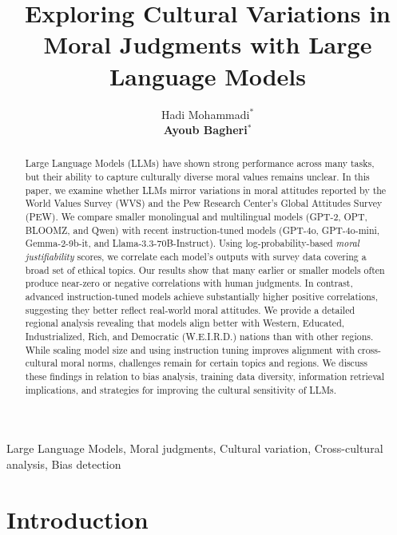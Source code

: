 \documentclass[a4paper,10pt,twoside]{article}
\begin{document}
\title{Exploring Cultural Variations in Moral Judgments with Large Language Models}

\author{Hadi Mohammadi$^*$ \\
{\normalsize \bf Ayoub Bagheri}$^*$ 
\AND {}}

\maketitle\thispagestyle{empty}

\begin{abstract}
Large Language Models (LLMs) have shown strong performance across many tasks, but their ability to capture culturally diverse moral values remains unclear. In this paper, we examine whether LLMs mirror variations in moral attitudes reported by the World Values Survey (WVS) and the Pew Research Center's Global Attitudes Survey (PEW). We compare smaller monolingual and multilingual models (GPT-2, OPT, BLOOMZ, and Qwen) with recent instruction-tuned models (GPT-4o, GPT-4o-mini, Gemma-2-9b-it, and Llama-3.3-70B-Instruct). Using log-probability-based \emph{moral justifiability} scores, we correlate each model's outputs with survey data covering a broad set of ethical topics. Our results show that many earlier or smaller models often produce near-zero or negative correlations with human judgments. In contrast, advanced instruction-tuned models achieve substantially higher positive correlations, suggesting they better reflect real-world moral attitudes. We provide a detailed regional analysis revealing that models align better with Western, Educated, Industrialized, Rich, and Democratic (W.E.I.R.D.) nations than with other regions. While scaling model size and using instruction tuning improves alignment with cross-cultural moral norms, challenges remain for certain topics and regions. We discuss these findings in relation to bias analysis, training data diversity, information retrieval implications, and strategies for improving the cultural sensitivity of LLMs.
\end{abstract}

\begin{keywords}
Large Language Models, Moral judgments, Cultural variation, Cross-cultural analysis, Bias detection
\end{keywords}

\section{Introduction}
\end{document}
